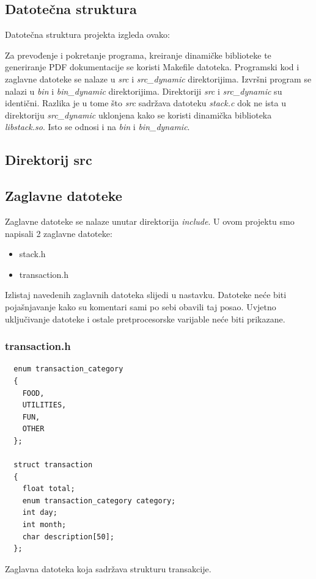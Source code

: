 \documentclass[12pt, letterpaper]{article}
\begin{document}
	\subsection{Datotečna struktura}
	Datotečna struktura projekta izgleda ovako:
  

  Za prevođenje i pokretanje programa, kreiranje dinamičke biblioteke te generiranje PDF dokumentacije se koristi Makefile datoteka.
  Programski kod i zaglavne datoteke se nalaze u \textit{src} i \textit{src\_dynamic} direktorijima.
  Izvršni program se nalazi u \textit{bin} i \textit{bin\_dynamic} direktorijima.
  Direktoriji \textit{src} i \textit{src\_dynamic} su identični. Razlika je u tome što \textit{src} sadržava datoteku \textit{stack.c} dok ne ista u direktoriju \textit{src\_dynamic} uklonjena kako se koristi dinamička biblioteka \textit{libstack.so}. Isto se odnosi i na \textit{bin} i \textit{bin\_dynamic}.

\subsection{Direktorij src}
		
  \subsection{Zaglavne datoteke}
  Zaglavne datoteke se nalaze unutar direktorija \textit{include}. U ovom projektu smo napisali 2 zaglavne datoteke:
  \begin{itemize}
    \item stack.h
    \item transaction.h
  \end{itemize}
  Izlistaj navedenih zaglavnih datoteka slijedi u nastavku. Datoteke neće biti pojašnjavanje kako su komentari sami po sebi obavili taj posao. Uvjetno uključivanje datoteke i ostale pretprocesorske varijable neće biti prikazane.
  \subsubsection{transaction.h} \label{struct_transaction}
  \begin{verbatim}
  enum transaction_category
  {
    FOOD,
    UTILITIES,
    FUN,
    OTHER
  };

  struct transaction
  {
    float total;
    enum transaction_category category;
    int day;
    int month;
    char description[50];
  };
  \end{verbatim}
  Zaglavna datoteka koja sadržava strukturu transakcije.
\end{document}
